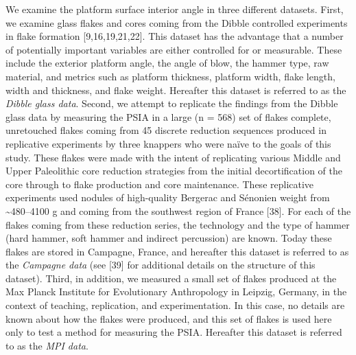 \documentclass[10pt,letterpaper]{article}
\begin{document}
We examine the platform surface interior angle in three different
datasets. First, we examine glass flakes and cores coming from the
Dibble controlled experiments in flake formation {[}9,16,19,21,22{]}.
This dataset has the advantage that a number of potentially important
variables are either controlled for or measurable. These include the
exterior platform angle, the angle of blow, the hammer type, raw
material, and metrics such as platform thickness, platform width, flake
length, width and thickness, and flake weight. Hereafter this dataset is
referred to as the \emph{Dibble glass data}. Second, we attempt to
replicate the findings from the Dibble glass data by measuring the PSIA
in a large (n = 568) set of flakes complete, unretouched flakes coming
from 45 discrete reduction sequences produced in replicative experiments
by three knappers who were naïve to the goals of this study. These
flakes were made with the intent of replicating various Middle and Upper
Paleolithic core reduction strategies from the initial decortification
of the core through to flake production and core maintenance. These
replicative experiments used nodules of high-quality Bergerac and
Sénonien weight from \textasciitilde480--4100 g and coming from the
southwest region of France {[}38{]}. For each of the flakes coming from
these reduction series, the technology and the type of hammer (hard
hammer, soft hammer and indirect percussion) are known. Today these
flakes are stored in Campagne, France, and hereafter this dataset is
referred to as the \emph{Campagne data} (see {[}39{]} for additional
details on the structure of this dataset). Third, in addition, we
measured a small set of flakes produced at the Max Planck Institute for
Evolutionary Anthropology in Leipzig, Germany, in the context of
teaching, replication, and experimentation. In this case, no details are
known about how the flakes were produced, and this set of flakes is used
here only to test a method for measuring the PSIA. Hereafter this
dataset is referred to as the \emph{MPI data}.
\end{document}
